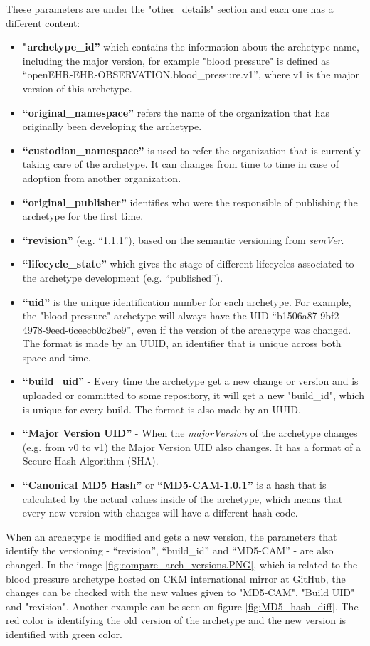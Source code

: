 \documentclass[mim_thesis.tex]{subfiles}
\begin{document}
These parameters are under the "other\_details" section and each one has a different content: 
\begin{itemize}[noitemsep]
\item \textbf{"archetype\_id”} which contains the information about the archetype name, including the major version, for example "blood pressure" is defined as “openEHR-EHR-OBSERVATION.blood\_pressure.v1”, where v1 is the major 
version of this archetype.   
\item \textbf{“original\_namespace”} refers the name of the organization that has originally been developing the archetype. 
\item \textbf{“custodian\_namespace”} is used to refer the organization that is currently taking care of the archetype. It can changes from time to time in case of adoption from another organization. 
\item \textbf{“original\_publisher”} identifies who were the responsible of publishing the archetype for the first time.   
\item \textbf{“revision”} (e.g. “1.1.1”), based on the semantic versioning from \textit{semVer}. 
\item \textbf{“lifecycle\_state”} which gives the stage of different lifecycles associated to the archetype development (e.g. “published”).
\item \textbf{“uid”}  is the unique identification number for each archetype. For example, 
the "blood pressure" archetype will always have the UID “b1506a87-9bf2-
4978-9eed-6ceecb0c2be9”, even if the version of the archetype was  changed. The format is made by an \ac{UUID}, an identifier that is unique across both space and time. 
\item \textbf{“build\_uid”} -  Every time the archetype get a new change or version and is uploaded or committed to some repository, it will get a new "build\_id", which is unique for every build. The format is also made by an UUID. 
\item \textbf{“Major Version UID”} - When the \textit{majorVersion} of the archetype changes (e.g. from v0 to v1) the Major Version UID also changes. It has a format of a Secure Hash Algorithm (SHA).
\item \textbf{“Canonical MD5 Hash”} or \textbf{“MD5-CAM-1.0.1”} is a hash that is calculated by the actual values inside of the archetype, which means that every new version with changes will have a different hash code.
\end{itemize}

When an archetype is modified and gets a new version, the parameters that identify  the versioning - “revision”, “build\_id” and “MD5-CAM” - are also changed. In the image \ref{fig:compare_arch_versions.PNG}, which is related to the blood pressure archetype hosted on CKM international mirror at GitHub, the changes can be checked with the new values given to "MD5-CAM", "Build UID" and "revision". Another example can be seen on figure \ref{fig:MD5_hash_diff}. The red color is identifying the old version of the archetype and the new version is identified with green color.  
\end{document}
